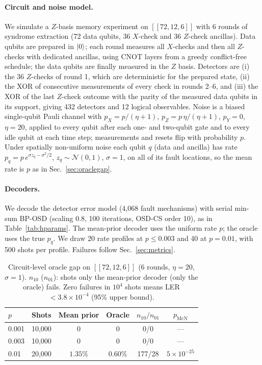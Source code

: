 \documentclass[a4paper,twocolumn,11pt,nopdfoutputerror]{quantumarticle}
\newcommand{\code}[3]{\ensuremath{[\![#1,#2,#3]\!]}}
\begin{document}
\paragraph{Circuit and noise model.} We simulate a $Z$-basis memory
experiment on $\code{72}{12}{6}$ with 6 rounds of syndrome extraction
(72 data qubits, 36 $X$-check and 36 $Z$-check ancillas). Data qubits are
prepared in $\ket{0}$; each round measures all $X$-checks and then all
$Z$-checks with dedicated ancillas, using CNOT layers from a greedy
conflict-free schedule; the data qubits are finally measured in the $Z$
basis. Detectors are (i) the 36 $Z$-checks of round 1, which are
deterministic for the prepared state, (ii) the XOR of consecutive
measurements of every check in rounds 2--6, and (iii) the XOR of the last
$Z$-check outcome with the parity of the measured data qubits in its
support, giving 432 detectors and 12 logical observables. Noise is a
biased single-qubit Pauli channel with $p_X=p/(\eta+1)$,
$p_Z=p\,\eta/(\eta+1)$, $p_Y=0$, $\eta=20$, applied to every qubit after
each one- and two-qubit gate and to every idle qubit at each time step;
measurements and resets flip with probability $p$. Under spatially
non-uniform noise each qubit $q$ (data and ancilla) has rate
$p_q=p\,e^{\sigma z_q-\sigma^2/2}$, $z_q\sim\mathcal N(0,1)$, $\sigma=1$,
on all of its fault locations, so the mean rate is $p$ as in
Sec.~\ref{sec:oraclegap}.

\paragraph{Decoders.} We decode the detector error model (4{,}068 fault
mechanisms) with serial min-sum BP-OSD (scaling 0.8, 100 iterations,
OSD-CS order 10), as in Table~\ref{tab:hparams}. The mean-prior decoder
uses the uniform rate $p$; the oracle uses the true $p_q$. We draw
20 rate profiles at $p\le0.003$ and 40 at
$p=0.01$, with 500 shots per profile. Failures follow
Sec.~\ref{sec:metrics}.

\begin{table}[t]
\centering
\caption{Circuit-level oracle gap on $\code{72}{12}{6}$ (6 rounds,
         $\eta=20$, $\sigma=1$). $n_{10}$ ($n_{01}$): shots only the
         mean-prior decoder (only the oracle) fails. Zero failures in
         $10^4$ shots means LER $<3.8\times10^{-4}$ (95\% upper bound).}
\label{tab:circuit}
\footnotesize
\setlength{\tabcolsep}{4pt}
\begin{tabular}{@{}lccccc@{}}
\toprule
$p$ & Shots & Mean prior & Oracle & $n_{10}/n_{01}$ & $p_\mathrm{McN}$ \\
\midrule
0.001 & 10{,}000 & 0 & 0 & 0/0 & --- \\
0.003 & 10{,}000 & 0 & 0 & 0/0 & --- \\
0.01  & 20{,}000 & $1.35\%$ & $0.60\%$ & 177/28 & $5\!\times\!10^{-25}$ \\
\bottomrule
\end{tabular}
\end{table}
\end{document}
